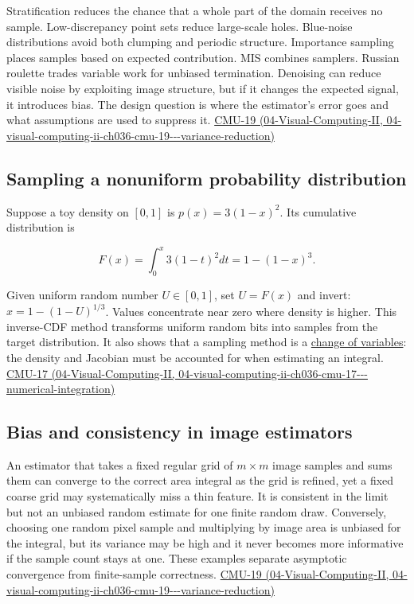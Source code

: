 Stratification reduces the chance that a whole part of the domain receives no sample. Low-discrepancy point sets reduce large-scale holes. Blue-noise distributions avoid both clumping and periodic structure. Importance sampling places samples based on expected contribution. MIS combines samplers. Russian roulette trades variable work for unbiased termination. Denoising can reduce visible noise by exploiting image structure, but if it changes the expected signal, it introduces bias. The design question is where the estimator's error goes and what assumptions are used to suppress it. \href{../04-Visual-Computing-II/main.pdf\#nameddest=04-visual-computing-ii-ch036-cmu-19---variance-reduction}{CMU-19 (04-Visual-Computing-II, 04-visual-computing-ii-ch036-cmu-19-\/-\/-variance-reduction)}

\subsection{Sampling a nonuniform probability distribution}\label{03-visual-computing-i-ch012-sampling-a-nonuniform-probability-distribution}

Suppose a toy density on \([0,1]\) is \(p(x)=3(1-x)^2\). Its cumulative distribution is

\[
F(x)=\int_0^x3(1-t)^2dt=1-(1-x)^3.
\]

Given uniform random number \(U\in[0,1]\), set \(U=F(x)\) and invert: \(x=1-(1-U)^{1/3}\). Values concentrate near zero where density is higher. This inverse-CDF method transforms uniform random bits into samples from the target distribution. It also shows that a sampling method is a \hyperref[appendix-4815cd87ab8b]{change of variables}: the density and Jacobian must be accounted for when estimating an integral. \href{../04-Visual-Computing-II/main.pdf\#nameddest=04-visual-computing-ii-ch036-cmu-17---numerical-integration}{CMU-17 (04-Visual-Computing-II, 04-visual-computing-ii-ch036-cmu-17-\/-\/-numerical-integration)}

\subsection{Bias and consistency in image estimators}\label{03-visual-computing-i-ch012-bias-and-consistency-in-image-estimators}

An estimator that takes a fixed regular grid of \(m\times m\) image samples and sums them can converge to the correct area integral as the grid is refined, yet a fixed coarse grid may systematically miss a thin feature. It is consistent in the limit but not an unbiased random estimate for one finite random draw. Conversely, choosing one random pixel sample and multiplying by image area is unbiased for the integral, but its variance may be high and it never becomes more informative if the sample count stays at one. These examples separate asymptotic convergence from finite-sample correctness. \href{../04-Visual-Computing-II/main.pdf\#nameddest=04-visual-computing-ii-ch036-cmu-19---variance-reduction}{CMU-19 (04-Visual-Computing-II, 04-visual-computing-ii-ch036-cmu-19-\/-\/-variance-reduction)}

